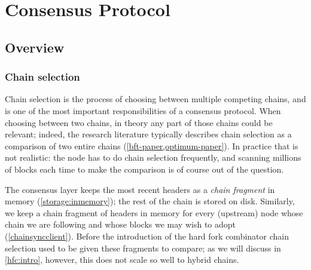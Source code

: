\chapter{Consensus Protocol}
\label{consensus}


%
%

\section{Overview}

\subsection{Chain selection}
\label{consensus:overview:chainsel}

Chain selection is the process of choosing between multiple competing chains,
and is one of the most important responsibilities of a consensus protocol. When
choosing between two chains, in theory any part of those chains could be
relevant; indeed, the research literature typically describes chain selection as
a comparison of two entire chains (\cref{bft-paper,optimum-paper}). In practice
that is not realistic: the node has to do chain selection frequently, and
scanning millions of blocks each time to make the comparison is of course out of
the question.

The consensus layer keeps the most recent headers as a \emph{chain fragment}
in memory (\cref{storage:inmemory}); the rest of the chain is stored on disk.
Similarly, we keep a chain fragment of headers in memory for every (upstream)
node whose chain we are following and whose blocks we may wish to adopt
(\cref{chainsyncclient}). Before the introduction of the hard fork combinator
chain selection used to be given these fragments to compare; as we will discuss
in \cref{hfc:intro}, however, this does not scale so well to hybrid chains.

